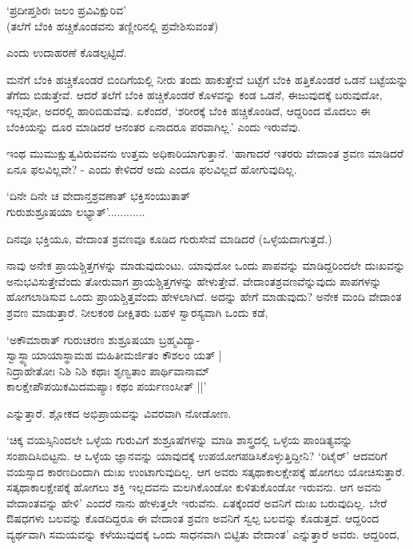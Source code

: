 \begin{shloka}
`ಪ್ರದೀಪ್ತಶಿರಃ ಜಲಂ ಪ್ರವಿವಿಕ್ಷುರಿವ'\\
(ತಲೆಗೆ ಬೆಂಕಿ ಹಚ್ಚಿಕೊಂಡವನು ತಣ್ಣೀರಿನಲ್ಲಿ ಪ್ರವೇಶಿಸುವಂತೆ)
\end{shloka}

ಎಂದು ಉದಾಹರಣೆ ಕೊಡಲ್ಪಟ್ಟಿದೆ.

ಮನೆಗೆ ಬೆಂಕಿ ಹಚ್ಚಿಕೊಂಡರೆ ಬಿಂದಿಗೆಯಲ್ಲಿ ನೀರು ತಂದು ಹಾಕುತ್ತೇವೆ ಬಟ್ಟೆಗೆ ಬೆಂಕಿ ಹತ್ತಿಕೊಂಡರೆ ಒಡನೆ ಬಟ್ಟೆಯನ್ನು ತೆಗೆದು ಬಿಡುತ್ತೇವೆ. ಆದರೆ ತಲೆಗೆ ಬೆಂಕಿ ಹಚ್ಚಿಕೊಂಡರೆ ಕೊಳವನ್ನು ಕಂಡ ಒಡನೆ, ಈಜುವುದಕ್ಕೆ ಬರುವುದೋ, ಇಲ್ಲವೋ, ಅದರಲ್ಲಿ ಹಾರಿಬಿಡುವೆವು. ಏಕೆಂದರೆ, `ಶರೀರಕ್ಕೆ ಬೆಂಕಿ ಹಚ್ಚಿಕೊಂಡಿದೆ, ಆದ್ದರಿಂದ ಮೊದಲು ಈ ಬೆಂಕಿಯನ್ನು ದೂರ ಮಾಡಿದರೆ ಆನಂತರ ಏನಾದರೂ ಪರವಾಗಿಲ್ಲ.' ಎಂದು ಇರುವೆವು.

ಇಂಥ ಮುಮುಕ್ಷುತ್ವವಿರುವವನು ಉತ್ತಮ ಅಧಿಕಾರಿಯಾಗುತ್ತಾನೆ. `ಹಾಗಾದರೆ ಇತರರು ವೇದಾಂತ ಶ್ರವಣ ಮಾಡಿದರೆ ಏನೂ ಫಲವಿಲ್ಲವೇ? - ಎಂದು ಕೇಳಿದರೆ ಅದು ಎಂದೂ ಫಲವಿಲ್ಲದೆ ಹೋಗುವುದಿಲ್ಲ.

\begin{shloka}
`ದಿನೇ ದಿನೇ ಚ ವೇದಾನ್ತಶ್ರವಣಾತ್ ಭಕ್ತಿಸಂಯುತಾತ್\\
ಗುರುಶುಶ್ರೂಷಯಾ ಲಭ್ಯಾತ್'............
\end{shloka}

ದಿನವೂ ಭಕ್ತಿಯೂ, ವೇದಾಂತ ಶ್ರವಣವೂ ಕೂಡಿದ ಗುರುಸೇವೆ ಮಾಡಿದರೆ (ಒಳ್ಳೆಯದಾಗುತ್ತದೆ.)

ನಾವು ಅನೇಕ ಪ್ರಾಯಶ್ಚಿತ್ತಗಳನ್ನು ಮಾಡುವುದುಂಟು. ಯಾವುದೋ ಒಂದು ಪಾಪವನ್ನು ಮಾಡಿದ್ದರಿಂದಲೇ ದುಃಖವನ್ನು ಅನುಭವಿಸುತ್ತೇವೆಂದು ತೋರುವಾಗ ಪ್ರಾಯಶ್ಚಿತ್ತಗಳನ್ನು ಹೇಳುತ್ತೇವೆ. ವೇದಾಂತಶ್ರವಣವೆನ್ನುವುದು ಪಾಪಗಳನ್ನು ಹೋಗಲಾಡಿಸುವ ಒಂದು ಪ್ರಾಯಶ್ಚಿತ್ತವೆಂದು ಹೇಳಲಾಗಿದೆ. ಅದನ್ನು ಹೇಗೆ ಮಾಡುವುದು? ಅನೇಕ ಮಂದಿ ವೇದಾಂತ ಶ್ರವಣ ಮಾಡುತ್ತಾರೆ. ನೀಲಕಂಠ ದೀಕ್ಷಿತರು ಬಹಳ ಸ್ವಾರಸ್ಯವಾಗಿ ಒಂದು ಕಡೆ,

\begin{shloka}
`ಅಕೌಮಾರಾತ್ ಗುರುಚರಣ ಶುಶ್ರೂಷಯಾ ಬ್ರಹ್ಮವಿದ್ಯಾ-\\
ಸ್ವಾಸ್ಥ್ಯಾಯಾಯಾಸ್ಥಾಮಹ ಮಹಿತೀಮರ್ಜಿತಂ ಕೌಶಲಂ ಯತ್ |\\
ನಿದ್ರಾಹೇತೋಃ ನಿಶಿ ನಿಶಿ ಕಥಾಃ ಶೃಣ್ವತಾಂ ಪಾರ್ಥಿವಾನಾಮ್\\
ಕಾಲಕ್ಷೇಪೌಪಯಿಕಮಿದಮಪ್ಯಾಃ ಕಥಂ ಪರ್ಯಣಂಸೀತ್ ||'
\end{shloka}

ಎನ್ನುತ್ತಾರೆ. ಶ್ಲೋಕದ ಅಭಿಪ್ರಾಯವನ್ನು ವಿವರವಾಗಿ ನೋಡೋಣ.

`ಚಿಕ್ಕ ವಯಸ್ಸಿನಿಂದಲೇ ಒಳ್ಳೆಯ ಗುರುವಿಗೆ ಶುಶ್ರೂಷೆಗಳನ್ನು ಮಾಡಿ ಶಾಸ್ತ್ರದಲ್ಲಿ ಒಳ್ಳೆಯ ಪಾಂಡಿತ್ಯವನ್ನು ಸಂಪಾದಿಸಿಬಿಟ್ಟನು. ಆ ಒಳ್ಳೆಯ ಜ್ಞಾನವನ್ನು ಯಾವುದಕ್ಕೆ ಉಪಯೋಗಪಡಿಸಿಕೊಳ್ಳುತ್ತಿದ್ದೀನಿ? `ರಿಟೈರ್' ಆದವರಿಗೆ ವಯಸ್ಸಾದ ಕಾರಣದಿಂದಾಗಿ ದುಃಖ ಉಂಟಾಗುವುದಿಲ್ಲ. ಆಗ ಅವರು ಸತ್ಕಥಾಕಾಲಕ್ಷೇಪಕ್ಕೆ ಹೋಗಲು ಯೋಚಿಸುತ್ತಾರೆ. ಸತ್ಕಥಾಕಾಲಕ್ಷೇಪಕ್ಕೆ ಹೋಗಲು ಶಕ್ತಿ ಇಲ್ಲದವನು ಮಲಗಿಕೊಂಡೋ ಕುಳಿತುಕೊಂಡೋ ಇರುವನು. ಆಗ ಅವನು ವೇದಾಂತವನ್ನು ಹೇಳಿ' ಎಂದರೆ ನಾನು ಹೇಳುತ್ತಲೇ ಇರುವೆನು. ಏತಕ್ಕೆಂದರೆ ಅವನಿಗೆ ದುಃಖ ಬರುವುದಿಲ್ಲ. ಬೇರೆ ಔಷಧಗಳು ಬಲವನ್ನು ಕೊಡದಿದ್ದರೂ ಈ ವೇದಾಂತ ಶ್ರವಣ ಅವನಿಗೆ ಸ್ವಲ್ಪ ಬಲವನ್ನು ಕೊಡುತ್ತದೆ. ಆದ್ದರಿಂದ ವ್ಯರ್ಥವಾಗಿ ಸಮಯವನ್ನು ಕಳೆಯುವುದಕ್ಕೆ ಒಂದು ಸಾಧನವಾಗಿ ಬಿಟ್ಟಿತು ವೇದಾಂತ' ಎನ್ನುತ್ತಾರೆ ಅವರು. ಆದ್ದರಿಂದ,

